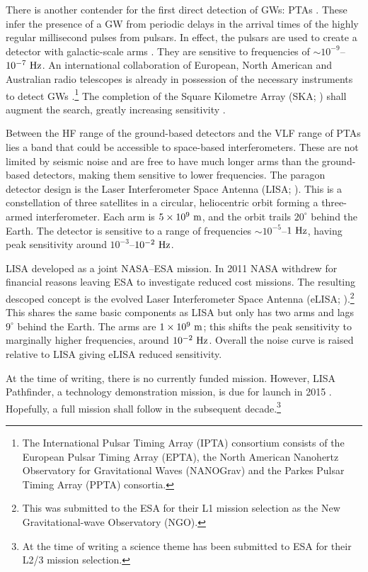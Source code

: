 There is another contender for the first direct detection of GWs: PTAs \citep{McWilliams2012,Sesana2012a}. These infer the presence of a GW from periodic delays in the arrival times of the highly regular millisecond pulses from pulsars. In effect, the pulsars are used to create a detector with galactic-scale arms \citep{Hellings1983}. They are sensitive to frequencies of $\sim10^{-9}$--$10^{-7}~\mathrm{Hz}$. An international collaboration of European, North American and Australian radio telescopes is already in possession of the necessary instruments to detect GWs \citep{Hobbs2010}.\footnote{The International Pulsar Timing Array (IPTA) consortium consists of the European Pulsar Timing Array (EPTA), the North American Nanohertz Observatory for Gravitational Waves (NANOGrav) and the Parkes Pulsar Timing Array (PPTA) consortia.} The completion of the Square Kilometre Array (SKA; \citealt{Dewdney2009}) shall augment the search, greatly increasing sensitivity \citep{Kramer2004}.

Between the HF range of the ground-based detectors and the VLF range of PTAs lies a band that could be accessible to space-based interferometers. These are not limited by seismic noise and are free to have much longer arms than the ground-based detectors, making them sensitive to lower frequencies. The paragon detector design is the Laser Interferometer Space Antenna (LISA; \citealt{Bender1998, Danzmann2003}). This is a constellation of three satellites in a circular, heliocentric orbit forming a three-armed interferometer. Each arm is $5 \times 10^9~\mathrm{m}$, and the orbit trails $20^{\circ}$ behind the Earth. The detector is sensitive to a range of frequencies $\sim10^{-5}$--$1~\mathrm{Hz}$, having peak sensitivity around $10^{-3}$--$10^{-2}~\mathrm{Hz}$.

LISA developed as a joint NASA--ESA mission. In 2011 NASA withdrew for financial reasons leaving ESA to investigate reduced cost missions. The resulting descoped concept is the evolved Laser Interferometer Space Antenna (eLISA; \citealt{Jennrich2011, Amaro-Seoane2012a}).\footnote{This was submitted to the ESA for their L1 mission selection as the New Gravitational-wave Observatory (NGO).} This shares the same basic components as LISA but only has two arms and lags $9^{\circ}$ behind the Earth. The arms are $1 \times 10^9~\mathrm{m}$; this shifts the peak sensitivity to marginally higher frequencies, around $10^{-2}~\mathrm{Hz}$. Overall the noise curve is raised relative to LISA giving eLISA reduced sensitivity.

At the time of writing, there is no currently funded mission. However, LISA Pathfinder, a technology demonstration mission, is due for launch in 2015 \citep{Anza2005, Antonucci2012}. Hopefully, a full mission shall follow in the subsequent decade.\footnote{At the time of writing a science theme has been submitted to ESA for their L2/3 mission selection.}

